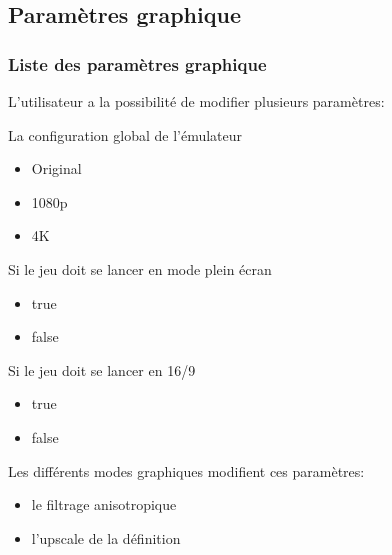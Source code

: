\documentclass[a4paper,12pt,french]{sphinxmanual}
\begin{document}
\subsection{Paramètres graphique}
\label{\detokenize{organique:parametres-graphique}}

\subsubsection{Liste des paramètres graphique}
\label{\detokenize{organique:liste-des-parametres-graphique}}
\sphinxAtStartPar
L’utilisateur a la possibilité de modifier plusieurs paramètres:

\sphinxAtStartPar
La configuration global de l’émulateur
\begin{itemize}
\item {} 
\sphinxAtStartPar
Original

\item {} 
\sphinxAtStartPar
1080p

\item {} 
\sphinxAtStartPar
4K

\end{itemize}

\sphinxAtStartPar
Si le jeu doit se lancer en mode plein écran
\begin{itemize}
\item {} 
\sphinxAtStartPar
true

\item {} 
\sphinxAtStartPar
false

\end{itemize}

\sphinxAtStartPar
Si le jeu doit se lancer en 16/9
\begin{itemize}
\item {} 
\sphinxAtStartPar
true

\item {} 
\sphinxAtStartPar
false

\end{itemize}

\sphinxAtStartPar
Les différents modes graphiques modifient ces paramètres:
\begin{itemize}
\item {} 
\sphinxAtStartPar
le filtrage anisotropique

\item {} 
\sphinxAtStartPar
l’upscale de la définition

\end{itemize}
\end{document}
